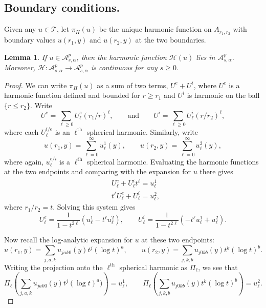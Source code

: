 \documentclass[12pt]{article}
\newtheorem{lem}[thm]{Lemma}
\newcommand{\calA}{{\mathcal A}}
\newcommand{\calH}{\mathcal H}
\newcommand{\calT}{{\mathcal T}}
\begin{document}
\subsection{Boundary conditions.}
Given any $u \in\calT$, let $\pi_H(u)$ be the unique harmonic function on $A_{r_1,r_2}$ with boundary values
$u(r_1,y)$ and $u(r_2, y)$ at the two boundaries.  

\begin{lem}
If $u \in \calA^p_{s,\alpha}$, then the harmonic function $\calH(u)$ lies in $\calA^p_{s,\alpha}$. Moreover, 
$\calH: \calA^p_{s,\alpha} \to \calA^p_{s,\alpha}$ is continuous for any $s \geq 0$.
\end{lem}
\begin{proof}
We can write $\pi_H(u)$ as a sum of two terms, $U^e + U^i$, where $U^e$ is a harmonic function defined and bounded 
for $r \geq r_1$ and $U^i$ is harmonic on the ball $\{r \leq r_2\}$.  Write 
\[
U^e = \sum_{\ell \geq 0} U_\ell^e (r_1/r)^\ell, \qquad \mbox{and}\qquad U^i = \sum_{\ell \geq 0} U_\ell^i (r/r_2)^{\ell},
\]
where each $U_{\ell}^{i/e}$ is an $\ell^{\mathrm{th}}$ spherical harmonic.  Similarly, write
\[
u(r_1, y) = \sum_{\ell = 0}^\infty  u_\ell^1(y), \qquad u(r_2, y) = \sum_{\ell=0}^\infty u_\ell^2(y),
\]
where again, $u_\ell^{e/i}$ is a $\ell^{\mathrm{th}}$ spherical harmonic.    Evaluating the harmonic functions at the two endpoints
and comparing with the expansion for $u$ there gives 
\[
\begin{split}
& U_\ell^e + U_\ell^i t^\ell = u_\ell^1 \\
& t^\ell U_\ell^e + U_\ell^i = u_\ell^2,
\end{split}
\]
where $r_1/r_2 = t$. Solving this system gives
\[
U_\ell^e = \frac{1}{1-t^{2\ell}} ( u_\ell^1 - t^\ell u_\ell^2), \qquad U_\ell^i = \frac{1}{1-t^{2\ell}} ( -t^\ell u_\ell^1 + u_\ell^2).
\]

Now recall the log-analytic expansion for $u$ at these two endpoints: 
\[
u(r_1,y) =\sum_{j, a, k} u_{jak0}(y) t^j (\log t)^a , \qquad u(r_2,y) = \sum_{j, k, b} u_{j 0 k b}(y) t^k (\log t)^b.
\]
Writing the projection onto the $\ell^{\mathrm{th}}$ spherical harmonic as $\Pi_\ell$, we see that
\[
\Pi_\ell \left(\sum_{j, a, k} u_{jak0}(y) t^j (\log t)^a)\right) = u_\ell^1, \qquad \Pi_\ell \left( \sum_{j, k, b} u_{j 0 k b}(y) t^k (\log t)^b \right) = u_\ell^2.
\]


\end{proof}
\end{document}
